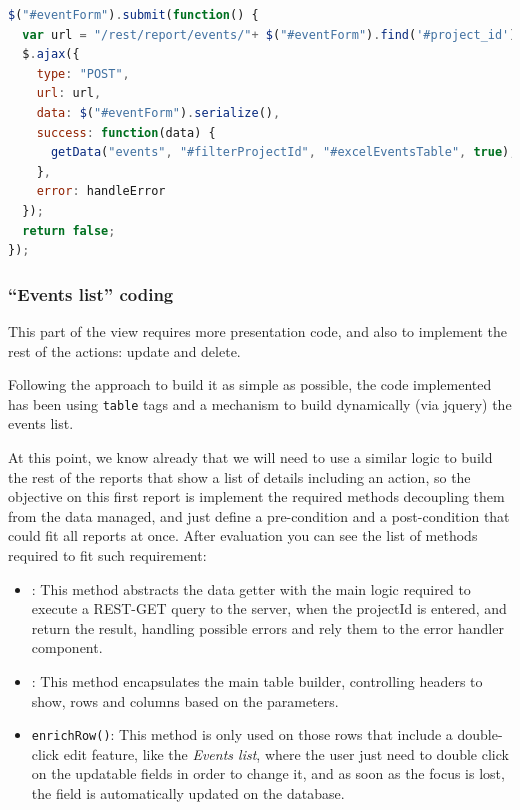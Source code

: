 \begin{lstlisting}[language=Javascript,breaklines=true,caption=Add\ new\ Event\
jQuery\ code,label=f_migration_addnewevent_jquery] 
$("#eventForm").submit(function() { 
  var url = "/rest/report/events/"+ $("#eventForm").find('#project_id').val();
  $.ajax({ 
    type: "POST", 
    url: url, 
    data: $("#eventForm").serialize(),
    success: function(data) {
      getData("events", "#filterProjectId", "#excelEventsTable", true);
    },
    error: handleError
  });
  return false;
});
\end{lstlisting}

\subsubsection{``Events list'' coding}
This part of the view requires more presentation code, and also to
implement the rest of the actions: update and delete.

Following the approach to build it as simple as possible, the code implemented
has been using \texttt{table} tags and a mechanism to build dynamically (via
jquery) the events list. 

At this point, we know already that we will need to use a similar logic to build
the rest of the reports that show a list of details including an action, so the
objective on this first report is implement the required methods decoupling them
from the data managed, and just define a pre-condition and a post-condition that
could fit all reports at once. After evaluation you can see the list of methods
required to fit such requirement:

\begin{itemize}
  \item {}: This method abstracts the data getter with the main
  logic required to execute a REST-GET query to the server, when the projectId
  is entered, and return the result, handling possible errors and rely them to
  the error handler component.
  \item {}: This method encapsulates the main table builder,
  controlling headers to show, rows and columns based on the parameters.
  \item \texttt{enrichRow()}: This method is only used on those rows that
  include a double-click edit feature, like the \emph{Events list}, where the
  user just need to double click on the updatable fields in order to change
  it, and as soon as the focus is lost, the field is automatically updated on
  the database.
\end{itemize}


